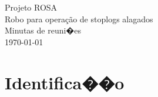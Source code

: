 \documentclass[12pt,a4paper]{article}
\begin{document}
\pagestyle{fancy}%
\thispagestyle{fancy}%
\renewcommand{\headrulewidth}  {0.4pt}%
\renewcommand{\footrulewidth}  {0.4pt}%
% 
% 
% 
% 

\vfill%
\begin{center}
  {\GRANDE Projeto ROSA} \\[5mm]
  {\Grande Robo para operação de stoplogs alagados} \\[25mm]
  {\Grande Minutas de reuni�es} \\
  \vfill%
  {\Large \today} \\[8mm]
\end{center}

\newpage%
\pagestyle{fancy}%
\thispagestyle{fancy}%
\renewcommand{\headrulewidth}  {0.4pt}%
\renewcommand{\footrulewidth}  {0.4pt}%
%
%
\rhead{\sf\thepage}%
%
\cfoot{}%
\rfoot{\sf [\hours] \quad \today}%

\tableofcontents

\newpage%
\section{Identifica��o}
\end{document}
